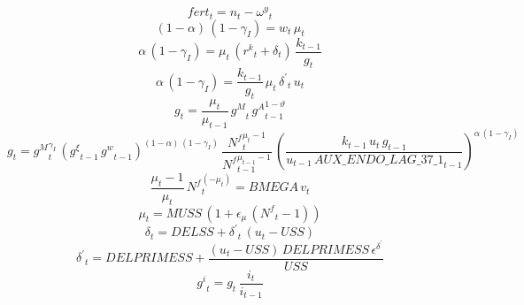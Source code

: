 \begin{dmath}
{{fert}}_{t}={{n}}_{t}-{{\omega^{y}}}_{t}
\end{dmath}
\begin{dmath}
\left(1-{{\alpha}}\right)\, \left(1-{{\gamma_I}}\right)={{w}}_{t}\, {{\mu}}_{t}
\end{dmath}
\begin{dmath}
{{\alpha}}\, \left(1-{{\gamma_I}}\right)={{\mu}}_{t}\, \left({{r^k}}_{t}+{{\delta}}_{t}\right)\, \frac{{{k}}_{t-1}}{{{g}}_{t}}
\end{dmath}
\begin{dmath}
{{\alpha}}\, \left(1-{{\gamma_I}}\right)=\frac{{{k}}_{t-1}}{{{g}}_{t}}\, {{\mu}}_{t}\, {{\delta^\prime}}_{t}\, {{u}}_{t}
\end{dmath}
\begin{dmath}
{{g}}_{t}=\frac{{{\mu}}_{t}}{{{\mu}}_{t-1}}\, {{g^M}}_{t}\, {{g^A}}_{t-1}^{1-{{\vartheta}}}
\end{dmath}
\begin{dmath}
{{g}}_{t}={{g^M}}_{t}^{{{\gamma_I}}}\, \left({{g^{\xi}}}_{t-1}\, {{g^w}}_{t-1}\right)^{\left(1-{{\alpha}}\right)\, \left(1-{{\gamma_I}}\right)}\, \frac{{{N^f}}_{t}^{{{\mu}}_{t}-1}}{{{N^f}}_{t-1}^{{{\mu}}_{t-1}-1}}\, \left(\frac{{{k}}_{t-1}\, {{u}}_{t}\, {{g}}_{t-1}}{{{u}}_{t-1}\, {AUX\_ENDO\_LAG\_37\_1}_{t-1}}\right)^{{{\alpha}}\, \left(1-{{\gamma_I}}\right)}
\end{dmath}
\begin{dmath}
\frac{{{\mu}}_{t}-1}{{{\mu}}_{t}}\, {{N^f}}_{t}^{\left(-{{\mu}}_{t}\right)}={{BMEGA}}\, {{v}}_{t}
\end{dmath}
\begin{dmath}
{{\mu}}_{t}={{MUSS}}\, \left(1+{{\epsilon_{\mu}}}\, \left({{N^f}}_{t}-1\right)\right)
\end{dmath}
\begin{dmath}
{{\delta}}_{t}={{DELSS}}+{{\delta^\prime}}_{t}\, \left({{u}}_{t}-{{USS}}\right)
\end{dmath}
\begin{dmath}
{{\delta^\prime}}_{t}={{DELPRIMESS}}+\frac{\left({{u}}_{t}-{{USS}}\right)\, {{DELPRIMESS}}\, {{\epsilon^{\delta^{\prime}}}}}{{{USS}}}
\end{dmath}
\begin{dmath}
{{g^i}}_{t}={{g}}_{t}\, \frac{{{i}}_{t}}{{{i}}_{t-1}}
\end{dmath}
